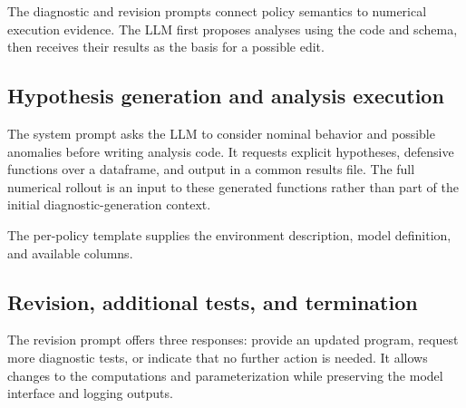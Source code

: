 The diagnostic and revision prompts connect policy semantics to numerical execution evidence.
The LLM first proposes analyses using the code and schema, then receives their results as the basis for a possible edit.

\subsection{Hypothesis generation and analysis execution}
\label{app:diagnostic-prompts}

The system prompt asks the LLM to consider nominal behavior and possible anomalies before writing analysis code.
It requests explicit hypotheses, defensive functions over a dataframe, and output in a common results file.
The full numerical rollout is an input to these generated functions rather than part of the initial diagnostic-generation context.

The per-policy template supplies the environment description, model definition, and available columns.

\subsection{Revision, additional tests, and termination}
\label{app:revision-prompts}

The revision prompt offers three responses: provide an updated program, request more diagnostic tests, or indicate that no further action is needed.
It allows changes to the computations and parameterization while preserving the model interface and logging outputs.


